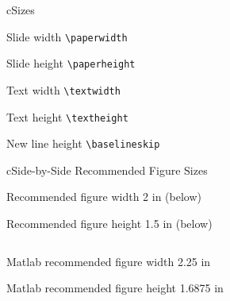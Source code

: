 \begin{myslidefragile}{c}{Sizes}

Slide width \lstinline{\paperwidth}
\def\x{\paperwidth}
\printlength{\x}
\printlength{\x}
\printlength{\x}

Slide height \lstinline{\paperheight}
\def\x{\paperheight}
\printlength{\x}
\printlength{\x}
\printlength{\x}

Text width \lstinline{\textwidth}
\def\x{\textwidth}
\printlength{\x}
\printlength{\x}
\printlength{\x}

Text height \lstinline{\textheight}
\def\x{\textheight}
\printlength{\x}
\printlength{\x}
\printlength{\x}

New line height
\lstinline{\baselineskip}
\def\x{\baselineskip}
\printlength{\x}
\printlength{\x}
\printlength{\x}

\end{myslidefragile}

\begin{myslide}{c}{Side-by-Side Recommended Figure Sizes}

Recommended figure width 2 in (below)

Recommended figure height 1.5 in (below)

\begin{columns}



\end{columns}

\vspace{\baselineskip}

Matlab recommended figure width 2.25 in

Matlab recommended figure height 1.6875 in

\end{myslide}